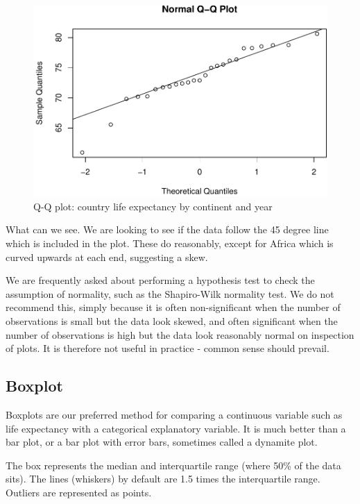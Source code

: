 \documentclass[12pt,]{krantz}
\theoremstyle{definition}
\theoremstyle{definition}
\theoremstyle{definition}
\theoremstyle{remark}
\begin{document}
\begin{figure}
\centering
\includegraphics{06_tests_continuous_files/figure-latex/unnamed-chunk-5-1.pdf}
\caption{\label{fig:unnamed-chunk-5}Q-Q plot: country life expectancy by
continent and year}
\end{figure}

 
 

What can we see. We are looking to see if the data follow the 45 degree
line which is included in the plot. These do reasonably, except for
Africa which is curved upwards at each end, suggesting a skew.

We are frequently asked about performing a hypothesis test to check the
assumption of normality, such as the Shapiro-Wilk normality test. We do
not recommend this, simply because it is often non-significant when the
number of observations is small but the data look skewed, and often
significant when the number of observations is high but the data look
reasonably normal on inspection of plots. It is therefore not useful in
practice - common sense should prevail.

\hypertarget{boxplot}{%
\subsection{Boxplot}\label{boxplot}}

Boxplots are our preferred method for comparing a continuous variable
such as life expectancy with a categorical explanatory variable. It is
much better than a bar plot, or a bar plot with error bars, sometimes
called a dynamite plot.

The box represents the median and interquartile range (where 50\% of the
data sits). The lines (whiskers) by default are 1.5 times the
interquartile range. Outliers are represented as points.
\end{document}
